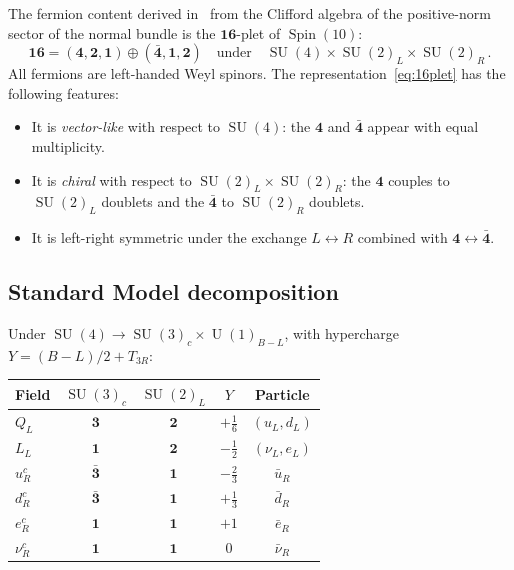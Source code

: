 \documentclass[12pt,a4paper]{article}
\theoremstyle{definition}
\newcommand{\SU}{\operatorname{SU}}
\newcommand{\U}{\operatorname{U}}
\newcommand{\Spin}{\operatorname{Spin}}
\begin{document}
The fermion content derived in~\cite{Paper2} from the Clifford algebra of the positive-norm sector of the normal bundle is the $\mathbf{16}$-plet of $\Spin(10)$:
\begin{equation}
\label{eq:16plet}
\mathbf{16} = (\mathbf{4}, \mathbf{2}, \mathbf{1}) \oplus (\bar{\mathbf{4}}, \mathbf{1}, \mathbf{2}) \quad\text{under}\quad \SU(4) \times \SU(2)_L \times \SU(2)_R\,.
\end{equation}
All fermions are left-handed Weyl spinors.
The representation~\eqref{eq:16plet} has the following features:
\begin{itemize}[nosep]
\item It is \emph{vector-like} with respect to $\SU(4)$: the $\mathbf{4}$ and $\bar{\mathbf{4}}$ appear with equal multiplicity.
\item It is \emph{chiral} with respect to $\SU(2)_L \times \SU(2)_R$: the $\mathbf{4}$ couples to $\SU(2)_L$ doublets and the $\bar{\mathbf{4}}$ to $\SU(2)_R$ doublets.
\item It is left-right symmetric under the exchange $L \leftrightarrow R$ combined with $\mathbf{4} \leftrightarrow \bar{\mathbf{4}}$.
\end{itemize}

\subsection{Standard Model decomposition}

Under $\SU(4) \to \SU(3)_c \times \U(1)_{B-L}$, with hypercharge $Y = (B{-}L)/2 + T_{3R}$:

\begin{center}
\renewcommand{\arraystretch}{1.3}
\begin{tabular}{lcccc}
\toprule
\textbf{Field} & $\SU(3)_c$ & $\SU(2)_L$ & $Y$ & \textbf{Particle} \\
\midrule
$Q_L$ & $\mathbf{3}$ & $\mathbf{2}$ & $+\tfrac{1}{6}$ & $(u_L, d_L)$ \\
$L_L$ & $\mathbf{1}$ & $\mathbf{2}$ & $-\tfrac{1}{2}$ & $(\nu_L, e_L)$ \\
$u_R^c$ & $\bar{\mathbf{3}}$ & $\mathbf{1}$ & $-\tfrac{2}{3}$ & $\bar{u}_R$ \\
$d_R^c$ & $\bar{\mathbf{3}}$ & $\mathbf{1}$ & $+\tfrac{1}{3}$ & $\bar{d}_R$ \\
$e_R^c$ & $\mathbf{1}$ & $\mathbf{1}$ & $+1$ & $\bar{e}_R$ \\
$\nu_R^c$ & $\mathbf{1}$ & $\mathbf{1}$ & $0$ & $\bar{\nu}_R$ \\
\bottomrule
\end{tabular}
\end{center}
\end{document}
